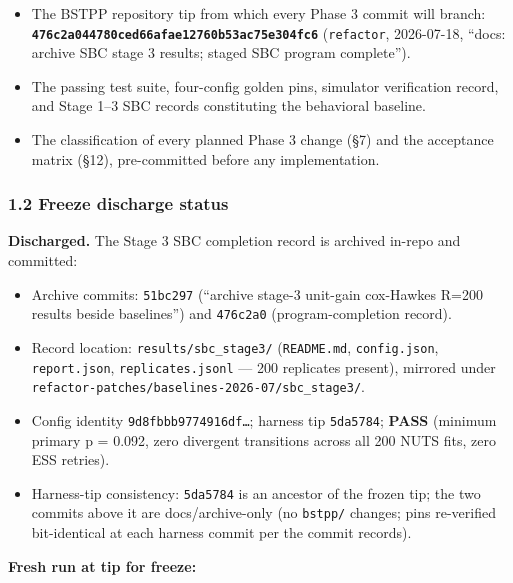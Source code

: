 \documentclass[
  10pt,
]{article}
\providecommand{\tightlist}{%
  \setlength{\itemsep}{0pt}\setlength{\parskip}{0pt}}
\begin{document}
\begin{itemize}
\tightlist
\item
  The BSTPP repository tip from which every Phase 3 commit will branch: \textbf{\texttt{476c2a0447\allowbreak{}80ced66afa\allowbreak{}e12760b53a\allowbreak{}c75e304fc6}} (\texttt{refactor}, 2026-07-18, ``docs: archive SBC stage 3 results; staged SBC program complete'').
\item
  The passing test suite, four-config golden pins, simulator verification record, and Stage 1--3 SBC records constituting the behavioral baseline.
\item
  The classification of every planned Phase 3 change (§7) and the acceptance matrix (§12), pre-committed before any implementation.
\end{itemize}

\hypertarget{freeze-discharge-status}{%
\subsubsection{1.2 Freeze discharge status}\label{freeze-discharge-status}}

\textbf{Discharged.} The Stage 3 SBC completion record is archived in-repo and committed:

\begin{itemize}
\tightlist
\item
  Archive commits: \texttt{51bc297} (``archive stage-3 unit-gain cox-Hawkes R=200 results beside baselines'') and \texttt{476c2a0} (program-completion record).
\item
  Record location: \texttt{results/sbc\_stage3/} (\texttt{README.md}, \texttt{config.json}, \texttt{report.json}, \texttt{replicates.jsonl} --- 200 replicates present), mirrored under \texttt{refactor-patches/\allowbreak{}baselines-2026-07/\allowbreak{}sbc\_\allowbreak{}stage3/\allowbreak{}}.
\item
  Config identity \texttt{9d8fbbb9774916df…}; harness tip \texttt{5da5784}; \textbf{PASS} (minimum primary p = 0.092, zero divergent transitions across all 200 NUTS fits, zero ESS retries).
\item
  Harness-tip consistency: \texttt{5da5784} is an ancestor of the frozen tip; the two commits above it are docs/archive-only (no \texttt{bstpp/} changes; pins re-verified bit-identical at each harness commit per the commit records).
\end{itemize}

\textbf{Fresh run at tip for freeze:}
\end{document}
